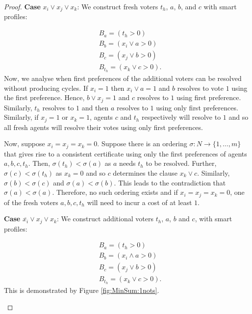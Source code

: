 \documentclass[11pt,a4paper, titlepage]{article}
\theoremstyle{definition}
\begin{document}
\begin{proof}
\textbf{Case} $x_i \lor x_j \lor x_k$: We construct fresh voters $t_h$, $a$, $b$, and $c$ with smart profiles:

\begin{align*}
    &B_a = (t_h > 0) \\
    &B_b = (x_i \lor a > 0) \\
    &B_c = (x_j \lor b > 0) \\
    &B_{t_h} = (x_k \lor c > 0).
\end{align*}
Now, we analyse when first preferences of the additional voters can be resolved without producing cycles. If $x_i = 1$ then $x_i \lor a = 1$ and $b$ resolves to vote $1$ using the first preference. 
Hence, $b \lor x_j = 1$ and $c$ resolves to $1$ using first preference. 
Similarly, $t_h$ resolves to $1$ and then $a$ resolves to $1$ using only first preferences. 
Similarly, if $x_j = 1$ or $x_k = 1$, agents $c$ and $t_h$ respectively will resolve to $1$ and so all fresh agents will resolve their votes using only first preferences.

Now, suppose $x_i = x_j = x_k = 0$. Suppose there is an ordering $\sigma \colon N \longrightarrow \{1,\ldots, m\}$ that gives rise to a consistent certificate using only the first preferences of agents $a, b, c, t_h$. Then, $\sigma(t_h) < \sigma(a)$ as $a$ needs $t_h$ to be resolved. Further, $\sigma(c) < \sigma(t_h)$ as $x_k = 0$ and so $c$ determines the clause $x_k \lor c$. Similarly, $\sigma(b) < \sigma(c)$ and $\sigma(a) < \sigma(b)$. This leads to the contradiction that $\sigma(a) < \sigma(a)$. Therefore, no such ordering exists and if $x_i = x_j = x_k = 0$, one of the fresh voters $a, b, c, t_h$ will need to incur a cost of at least $1$.

\textbf{Case} $\overline{x_i} \lor x_j \lor x_k$: We construct additional voters $t_h$, $a$, $b$ and $c$, with smart profiles:

\begin{align*}
    &B_a = (t_h > 0) \\
    &B_b = (x_i \land a > 0) \\
    &B_c = (x_j \lor b > 0) \\
    &B_{t_h} = (x_k \lor c > 0).
\end{align*}
This is demonstrated by Figure \ref{fig:MinSum:1nots}.

    \begin{figure}
        \centering
\end{figure}
\end{proof}
\end{document}

